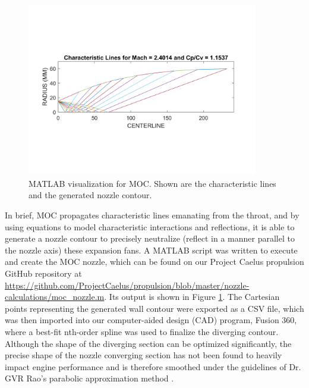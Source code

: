 \documentclass[9pt]{article} %
\numberwithin{equation}{section} %
\begin{document}
\begin{figure}
\centering
\includegraphics[scale=0.5, width=0.9\textwidth, trim={0.5cm 2.5cm 0.5cm 3.25cm}, clip]{moc} %
\caption{MATLAB visualization for MOC. Shown are the characteristic lines and the generated nozzle contour.}
\label{fig:moc}
\end{figure}

In brief, MOC propagates characteristic lines emanating from the throat, and by using equations to model characteristic interactions and reflections, it is able to generate a nozzle contour to precisely neutralize (reflect in a manner parallel to the nozzle axis) these expansion fans. A MATLAB script was written to execute and create the MOC nozzle, which can be found on our Project Caelus propulsion GitHub repository at \url{https://github.com/ProjectCaelus/propulsion/blob/master/nozzle-calculations/moc_nozzle.m}. Its output is shown in Figure \ref{fig:moc}. The Cartesian points representing the generated wall contour were exported as a CSV file, which was then imported into our computer-aided design (CAD) program, Fusion 360, where a best-fit nth-order spline was used to finalize the diverging contour. Although the shape of the diverging section can be optimized significantly, the precise shape of the nozzle converging section has not been found to heavily impact engine performance and is therefore smoothed under the guidelines of Dr. GVR Rao's parabolic approximation method \cite{rpe}\cite{rao}. 
\end{document}
